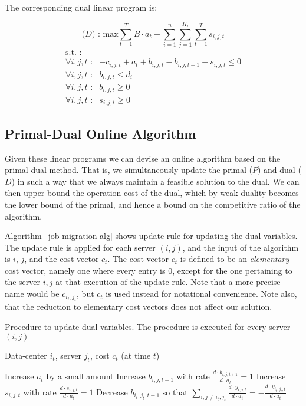 The corresponding dual linear program is:

\[
\textrm{($D$) : max}   \sum^{T}_{t=1}B \cdot a_t - \sum^{n}_{i=1}\sum^{H_i}_{j=1}\sum^{T}_{t=1}s_{i,j,t}
\]
\[
	\begin{array}{rc}
	\textrm{s.t. :} & \\
		\forall i,j,t \textrm{ :}	    & -c_{i,j,t} + a_t + b_{i,j,t} - b_{i,j,t+1} - s_{i,j,t} \leq 0 \\
		\forall i,j,t \textrm{ :}	    & b_{i,j,t} \leq d_i \\
		\forall i,j,t \textrm{ :}	    & b_{i,j,t} \geq 0 \\
		\forall i,j,t \textrm{ :}	    & s_{i,j,t} \geq 0
	\end{array}
\]

\subsection{Primal-Dual Online Algorithm}

Given these  linear programs we can devise an online algorithm based on the primal-dual method.
That is, we simultaneously update the primal ($P$) and dual ($D$) in such a way that we always maintain a feasible solution to the dual.
We can then upper bound the operation cost of the dual, which by weak duality becomes the lower bound of the primal, and hence a bound on the competitive ratio of the algorithm.

Algorithm~\ref{job-migration-alg} shows update rule for updating the dual variables.
The update rule is applied for each server $(i,j)$, and the input of the algorithm is $i$, $j$, and the cost vector $c_t$. 
The cost vector $c_t$ is defined to be an \emph{elementary} cost vector, namely one where every entry is $0$, except for the one pertaining to the server $i,j$ at that execution of the update rule.
Note that a more precise name would be $c_{i_t,j_t}$, but $c_t$ is used instead for notational convenience.
Note also, that the reduction to elementary cost vectors does not affect our solution.

\begin{algorithm}
\caption{Procedure to update dual variables. The procedure is executed for every server $(i,j)$}
\label{job-migration-alg}
\begin{algorithmic}[1]
\REQUIRE Data-center $i_t$, server $j_t$, cost $c_t$ (at time $t$)

  \STATE Increase $a_t$ by a small amount
    \STATE Increase $b_{i,j,t+1}$ with rate $\frac{d \cdot b_{i,j,t+1}}{d \cdot a_t} = 1$
  \ENDFOR
    \STATE Increase $s_{i,j,t}$ with rate $\frac{d \cdot s_{i,j,t}}{d \cdot a_t}=1$
  \ENDFOR
    \STATE Decrease $b_{i_t,j_t,t+1}$ so that $\sum_{i,j \neq i_t,j_t}\frac{d \cdot y_{i,j,t}}{d \cdot a_t} = -\frac{d \cdot y_{i_t,j_t,t}}{d \cdot a_t}$
  \ENDFOR
\ENDWHILE
\end{algorithmic}
\end{algorithm}

